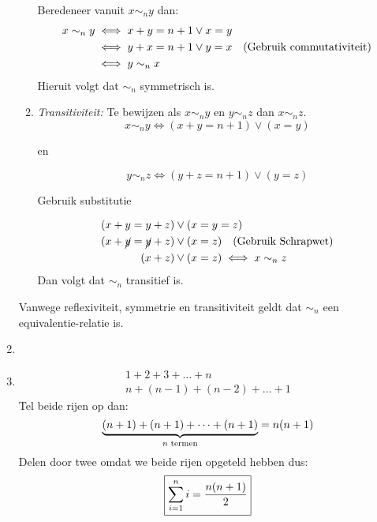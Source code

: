 \documentclass{article}
\begin{document}
\begin{enumerate}[label=\alph*)]
\begin{enumerate}[label=\arabic*.]
                    Beredeneer vanuit $x \sim_n y$ dan:
                    \begin{align*}
                        x  \sim_n y & \iff x + y = n + 1 \vee x = y                                      \\
                                    & \iff y + x = n + 1 \vee y = x \quad (\text{Gebruik commutativiteit}) \\
                                    & \iff y \sim_n x
                    \end{align*}
                    Hieruit volgt dat $\sim_n$ symmetrisch is.
              \item \emph{Transitiviteit:}
                    Te bewijzen als $x \sim_n y$ en $y \sim_n z$ dan $x \sim_n z$.
                    \[x \sim_n y \iff (x + y = n + 1) \vee (x = y)\]
                    \begin{center}
                        en
                    \end{center}
                    \[y \sim_n z \iff (y + z = n + 1) \vee (y = z)\]
                    \begin{center}
                        Gebruik substitutie
                    \end{center}
                    \begin{align*}
                        (x + y = y + z)           & \vee (x = y = z)                            \\
                        (x + \cancel{y} = \cancel{y} + z) & \vee (x = z) \quad (\text{Gebruik Schrapwet}) \\
                        (x + z)                   & \vee (x = z) \iff x \sim_n z
                    \end{align*}
                    Dan volgt dat $\sim_n$ transitief is.
          \end{enumerate}
          Vanwege reflexiviteit, symmetrie en transitiviteit geldt dat $\sim_n$ een equivalentie-relatie is.
    \item
    \item
          \begin{align*}
              1 + 2 + 3 + \dots + n \\
              n + (n-1) + (n-2) + \dots + 1
          \end{align*}
          Tel beide rijen op dan:
          \[\underbrace{(n+1) + (n+1) + \dots + (n+1)}_{n \text{ termen}} = n(n+1)\]
          Delen door twee omdat we beide rijen opgeteld hebben dus:
          \[\boxed{\sum_{i=1}^{n} i = \frac{n(n+1)}{2}}\]
\end{enumerate}
\end{document}
